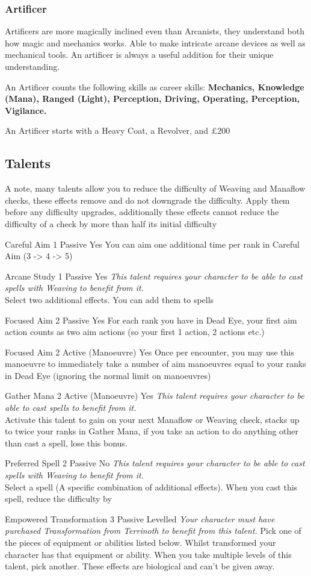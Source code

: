 \documentclass{article}
\newcommand{\WeaverPrereq}{\textit{This talent requires your character to be able to cast spells with Weaving to benefit from it.}\\}
\newcommand\CasterPrereq{\textit{This talent requires your character to be able to cast spells to benefit from it.}\\}
\begin{document}
\begin{multicols}{2}
{\subsubsection{Artificer}
Artificers are more magically inclined even than Arcanists, they understand both how magic and mechanics works. Able to make intricate arcane devices as well as mechanical tools. An artificer is always a useful addition for their unique understanding.\par
An Artificer counts the following skills as career skills: \textbf{Mechanics, Knowledge (Mana), Ranged (Light), Perception, Driving, Operating, Perception, Vigilance.}\par
An Artificer starts with a Heavy Coat, a Revolver, and £200 
}
\end{multicols}
\subsection{Talents}
\begin{multicols}{2}
A note, many talents allow you to reduce the difficulty of Weaving and Manaflow checks, these effects remove \Purple[1] and do not downgrade the difficulty. Apply them before any difficulty upgrades, additionally these effects cannot reduce the difficulty of a check by more than half its initial difficulty

\Talent
{Careful Aim}
{1}
{Passive}
{Yes}
{You can aim one additional time per rank in Careful Aim (3 -> 4 -> 5)}

\Talent
{Arcane Study}
{1}
{Passive}
{Yes}
{\WeaverPrereq Select two additional effects. You can add them to spells}

\Talent
{Focused Aim}
{2}
{Passive}
{Yes}
{For each rank you have in Dead Eye, your first aim action counts as two aim actions (so your first 1 action, 2 actions etc.)}

\Talent
{Focused Aim}
{2}
{Active (Manoeuvre)}
{Yes}
{Once per encounter, you may use this manoeuvre to immediately take a number of aim manoeuvres equal to your ranks in Dead Eye (ignoring the normal limit on manoeuvres)}

\Talent
{Gather Mana}
{2}
{Active (Manoeuvre)}
{Yes}
{\CasterPrereq
Activate this talent to gain \Blue[1] on your next Manaflow or Weaving check, stacks up to twice your ranks in Gather Mana, if you take an action to do anything other than cast a spell, lose this bonus.}

\Talent
{Preferred Spell}
{2}
{Passive}
{No}
{\WeaverPrereq
Select a spell (A specific combination of additional effects). When you cast this spell, reduce the difficulty by \DifficultyDie}

\Talent
{Empowered Transformation}
{3}
{Passive}
{Levelled}
{\textit{Your character must have purchased Transformation from Terrinoth to benefit from this talent.}
Pick one of the pieces of equipment or abilities listed below. Whilst transformed your character has that equipment or ability. When you take multiple levels of this talent, pick another. These effects are biological and can't be given away.
}
\end{multicols}
\end{document}
